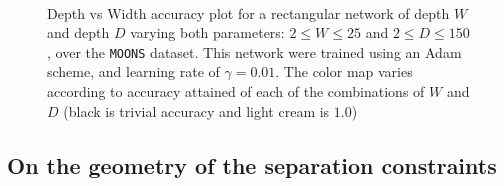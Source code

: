 \begin{figure}[h!]
\begin{subfigure}[b]{0.3\textwidth}
        \caption{\SepLayer}
        \label{fig:moons_grid_l}
    \end{subfigure}
    ~ %
    
  \caption{Depth vs Width accuracy plot for a rectangular network of depth $W$ and depth $D$ varying both parameters: $2\leq W\leq 25$ and $2\leq D\leq 150$, over the \texttt{MOONS} dataset. This network were trained using an Adam scheme, and learning rate of $\gamma = 0.01$. The color map varies according to accuracy attained of each of the combinations of $W$ and $D$ (black is trivial accuracy and light cream is $1.0$)} 
  \label{fig:moons_grid} 
\end{figure}
\subsection{On the geometry of the separation constraints}\label{subsec:geometryOfSeparation}
